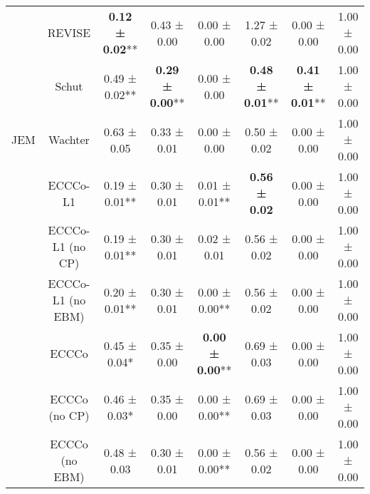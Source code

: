 \begin{table}
{\begin{tabular}[t]{cccccccc}
 & REVISE & \textbf{0.12 ± 0.02}** & 0.43 ± 0.00\hphantom{*}\hphantom{*} & 0.00 ± 0.00\hphantom{*}\hphantom{*} & 1.27 ± 0.02\hphantom{*}\hphantom{*} & 0.00 ± 0.00\hphantom{*}\hphantom{*} & 1.00 ± 0.00\hphantom{*}\hphantom{*}\\

 & Schut & 0.49 ± 0.02** & \textbf{0.29 ± 0.00}** & 0.00 ± 0.00\hphantom{*}\hphantom{*} & \textbf{0.48 ± 0.01}** & \textbf{0.41 ± 0.01}** & 1.00 ± 0.00\hphantom{*}\hphantom{*}\\

\multirow[t]{-9}{*}{\centering\arraybackslash JEM} & Wachter & 0.63 ± 0.05\hphantom{*}\hphantom{*} & 0.33 ± 0.01\hphantom{*}\hphantom{*} & 0.00 ± 0.00\hphantom{*}\hphantom{*} & 0.50 ± 0.02\hphantom{*}\hphantom{*} & 0.00 ± 0.00\hphantom{*}\hphantom{*} & 1.00 ± 0.00\hphantom{*}\hphantom{*}\\
\cmidrule{1-8}
 & ECCCo-L1 & 0.19 ± 0.01** & 0.30 ± 0.01\hphantom{*}\hphantom{*} & 0.01 ± 0.01** & \textbf{0.56 ± 0.02}\hphantom{*}\hphantom{*} & 0.00 ± 0.00\hphantom{*}\hphantom{*} & 1.00 ± 0.00\hphantom{*}\hphantom{*}\\

 & ECCCo-L1 (no CP) & 0.19 ± 0.01** & 0.30 ± 0.01\hphantom{*}\hphantom{*} & 0.02 ± 0.01\hphantom{*}\hphantom{*} & 0.56 ± 0.02\hphantom{*}\hphantom{*} & 0.00 ± 0.00\hphantom{*}\hphantom{*} & 1.00 ± 0.00\hphantom{*}\hphantom{*}\\

 & ECCCo-L1 (no EBM) & 0.20 ± 0.01** & 0.30 ± 0.01\hphantom{*}\hphantom{*} & 0.00 ± 0.00** & 0.56 ± 0.02\hphantom{*}\hphantom{*} & 0.00 ± 0.00\hphantom{*}\hphantom{*} & 1.00 ± 0.00\hphantom{*}\hphantom{*}\\

 & ECCCo & 0.45 ± 0.04*\hphantom{*} & 0.35 ± 0.00\hphantom{*}\hphantom{*} & \textbf{0.00 ± 0.00}** & 0.69 ± 0.03\hphantom{*}\hphantom{*} & 0.00 ± 0.00\hphantom{*}\hphantom{*} & 1.00 ± 0.00\hphantom{*}\hphantom{*}\\

 & ECCCo (no CP) & 0.46 ± 0.03*\hphantom{*} & 0.35 ± 0.00\hphantom{*}\hphantom{*} & 0.00 ± 0.00** & 0.69 ± 0.03\hphantom{*}\hphantom{*} & 0.00 ± 0.00\hphantom{*}\hphantom{*} & 1.00 ± 0.00\hphantom{*}\hphantom{*}\\

 & ECCCo (no EBM) & 0.48 ± 0.03\hphantom{*}\hphantom{*} & 0.30 ± 0.01\hphantom{*}\hphantom{*} & 0.00 ± 0.00** & 0.56 ± 0.02\hphantom{*}\hphantom{*} & 0.00 ± 0.00\hphantom{*}\hphantom{*} & 1.00 ± 0.00\hphantom{*}\hphantom{*}\\


\end{tabular}}
\end{table}
